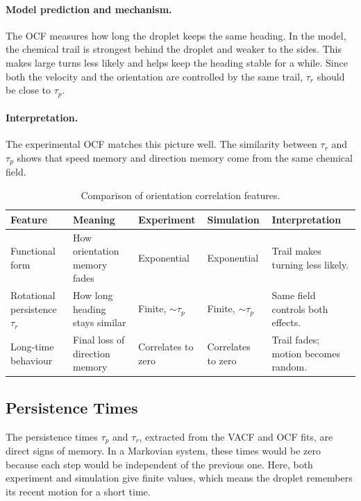 \paragraph{Model prediction and mechanism.}
The OCF measures how long the droplet keeps the same heading. In the model, the chemical trail is strongest behind the droplet and weaker to the sides. This makes large turns less likely and helps keep the heading stable for a while. Since both the velocity and the orientation are controlled by the same trail, $\tau_r$ should be close to $\tau_p$.

\paragraph{Interpretation.}
The experimental OCF matches this picture well. The similarity between $\tau_r$ and $\tau_p$ shows that speed memory and direction memory come from the same chemical field.

\begin{table}[htbp]
\centering
\caption{Comparison of orientation correlation features.}
\label{tab:ocf_comparison}
\renewcommand{\arraystretch}{1.25}
\begin{tabular}{p{2.4cm} p{3.0cm} p{2.3cm} p{2.3cm} p{3.2cm}}
\hline\hline
\textbf{Feature} & \textbf{Meaning} & \textbf{Experiment} & \textbf{Simulation} & \textbf{Interpretation} \\
\hline
Functional form & How orientation memory fades & Exponential & Exponential & Trail makes turning less likely. \\[4pt]
Rotational persistence $\tau_r$ & How long heading stays similar & Finite, $\sim\tau_p$ & Finite, $\sim\tau_p$ & Same field controls both effects. \\[4pt]
Long-time behaviour & Final loss of direction memory & Correlates to zero & Correlates to zero & Trail fades; motion becomes random. \\
\hline\hline
\end{tabular}
\end{table}

\subsection{Persistence Times}
\label{subsec:comp_persistence}

The persistence times $\tau_p$ and $\tau_r$, extracted from the VACF and OCF fits, are direct signs of memory. In a Markovian system, these times would be zero because each step would be independent of the previous one. Here, both experiment and simulation give finite values, which means the droplet remembers its recent motion for a short time.

